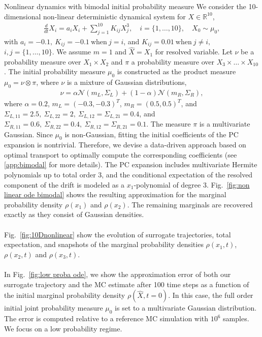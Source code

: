 \documentclass[11pt, a4paper, oneside, reqno]{amsart}
\makeatletter
\def\subsection{\@startsection{subsection}{2}%
	\z@{.5\linespacing\@plus.7\linespacing}{.5\linespacing}%
	{\normalfont\large\bfseries}}
\makeatother
\begin{document}
\subsection{Nonlinear dynamics with bimodal initial probability measure}
\noindent We consider the 10-dimensional non-linear deterministic dynamical system for $X\in\mathbb{R}^{10}$,
\begin{eqnarray}\label{eq:nonlinear dynamics}
    \frac{d}{dt}X_i = a_iX_i + \sum_{j=1}^{10}K_{ij}X_j^3,
    \quad i=\{1,\dots,10\}, \quad
    X_0 \sim \mu_0,
\end{eqnarray}
with $a_i=-0.1, \ K_{ij}=-0.1 \ \mathrm{ when }\ j=i $, and $K_{ij}=0.01 \ \mathrm{ when }\ j\neq i, \ $ $i,j=\{1,\dots,10\}$.
We assume $m=1$ and $\hat{X}=X_1$ for resolved variable. 
Let $\nu$ be a probability measure over $X_1 \times X_2$ and $\pi$ a probability measure over $X_3\times\dots\times X_{10}$.
The initial probability measure $\mu_0$ is constructed as the product measure $\mu_0=\nu \otimes \pi$, where $\nu$ is a mixture of Gaussian distributions,
\begin{eqnarray}\label{eq:bimodal measure}
    \nu = \alpha\mathcal{N}(m_{L},\Sigma_{L}) + (1-\alpha)\mathcal{N}(m_{R},\Sigma_{R}),
\end{eqnarray}
where $\alpha=0.2$, $m_L=(-0.3,-0.3)^T$, $m_R=(0.5,0.5)^T$, and $\Sigma_{L,11}=2.5, \: \Sigma_{L,22}=2,\: \Sigma_{L,12}=\Sigma_{L,21}=0.4$, and $\Sigma_{R,11}=0.6, \: \Sigma_{R,22}=0.4,\: \Sigma_{R,12}=\Sigma_{R,21}=0.1$. 
The measure $\pi$ is a multivariate Gaussian. 
Since $\mu_0$ is non-Gaussian, fitting the initial coefficients of the PC expansion is nontrivial.
Therefore, we devise a data-driven approach based on optimal transport to optimally compute the corresponding coefficients (see \ref{app:bimodal} for more details).
The PC expansion includes multivariate Hermite polynomials up to total order 3, and the conditional expectation of the resolved component of the drift is modeled as a $x_1$-polynomial of degree 3. 
Fig.~\ref{fig:non linear ode bimodal} shows the resulting approximation for the marginal probability density $\rho(x_1)$ and $\rho(x_2)$. The remaining marginals are recovered exactly as they consist of Gaussian densities.
\\ \ \\
Fig.~\ref{fig:10Dnonlinear} show the evolution of surrogate trajectories, total expectation, and snapshots of the marginal probability densities $\rho(x_1,t)$, $\rho(x_2,t)$ and $\rho(x_3,t)$. 
\\ \ \\
In Fig.~\ref{fig:low proba ode}, we show the approximation error of both
our surrogate trajectory and the MC estimate after 100 time steps as a function of the initial marginal probability density $\rho(\hat{X}, t=0)$. In this case, the full order initial joint probability measure $\mu_0$ is set to a multivariate Gaussian distribution. The error is computed relative to a reference MC simulation with $10^6$ samples. We focus on a low probability regime.    
\end{document}
